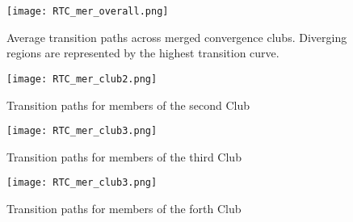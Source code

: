 \documentclass[11pt]{article}
\begin{document}
\begin{figure}%
\centering 
  {\texttt{[image: RTC\_mer\_overall.png]} }
  \caption{Average transition paths across merged convergence clubs. Diverging regions are represented by the highest transition curve.}
  \label{paths_overall}
  \end{figure}



\begin{figure}%
    \centering
    \texttt{[image: RTC\_mer\_club2.png]}
    \caption{Transition paths for members of the second Club}
    \label{paths2}
\end{figure}


\begin{figure}%
    \centering
    \texttt{[image: RTC\_mer\_club3.png]}
    \caption{Transition paths for members of the third Club}
    \label{paths3}
\end{figure}

\begin{figure}%
    \centering
    \texttt{[image: RTC\_mer\_club3.png]}
    \caption{Transition paths for members of the forth Club}
    \label{paths4}
\end{figure}
\end{document}
